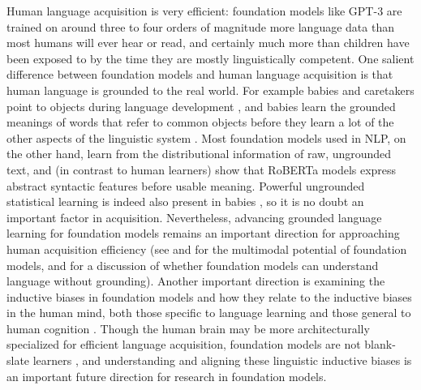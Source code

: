 Human language acquisition is very efficient: foundation models like GPT-3 are trained on around three to four orders of magnitude more language data than most humans will ever hear or read, and certainly much more than children have been exposed to by the time they are mostly linguistically competent. 
One salient difference between foundation models and human language acquisition is that human language is grounded to the real world. 
For example babies and caretakers point to objects during language development \citep{colonnesi2010relation}, and babies learn the grounded meanings of words that refer to common objects before they learn a lot of the other aspects of the linguistic system \citep{bergelson20126}. Most foundation models used in NLP, on the other hand, learn from the distributional information of raw, ungrounded text, and (in contrast to human learners) \citet{zhang2021billions} show that RoBERTa models express abstract syntactic features before usable meaning. Powerful ungrounded statistical learning is indeed also present in babies \citep{saffran1996statistical}, so it is no doubt an important factor in acquisition. Nevertheless, advancing grounded language learning for foundation models remains an important direction for approaching human acquisition efficiency
\citep[\textit{inter alia}]{dupoux2018cognitive, tan2020vokenization, zellers2021piglet} (see  and  for the multimodal potential of foundation models, and  for a discussion of whether foundation models can understand language without grounding). 
Another important direction is examining the inductive biases in foundation models and how they relate to the inductive biases in the human mind, both those specific to language learning and those general to human cognition \citep{linzen2021syntactic}. Though the human brain may be more architecturally specialized for efficient language acquisition, foundation models are not blank-slate learners \cite{baroni2021proper}, and understanding and aligning these linguistic inductive biases is an important future direction for research in foundation models. 

